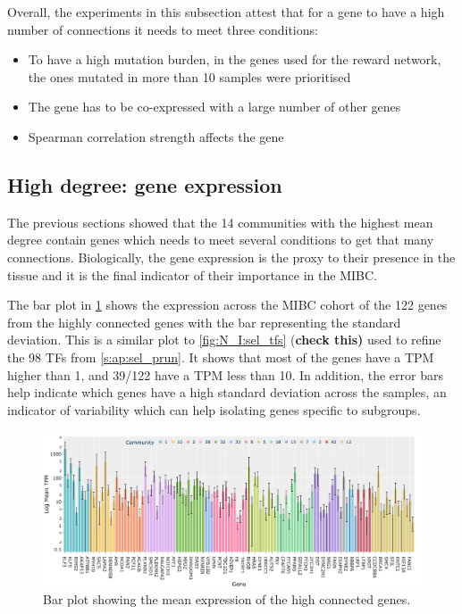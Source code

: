 Overall, the experiments in this subsection attest that for a gene to have a high number of connections it needs to meet three conditions:
\begin{itemize}
    \item To have a high mutation burden, in the genes used for the reward network, the ones mutated in more than 10 samples were prioritised
    \item The gene has to be co-expressed with a large number of other genes
    \item Spearman correlation strength affects the gene

\end{itemize}


\subsection{High degree: gene expression} \label{s:N_II:high_ge}

The previous sections showed that the 14 communities with the highest mean degree contain genes which needs to meet several conditions to get that many connections. Biologically, the gene expression is the proxy to their presence in the tissue and it is the final indicator of their importance in the MIBC.

The bar plot in \cref{fig:N_II:exp_molecular_highCon} shows the expression across the MIBC cohort of the 122 genes from the highly connected genes with the bar representing the standard deviation. This is a similar plot to \cref{fig:N_I:sel_tfs} (\textbf{check this)} used to refine the  98 TFs from \cref{s:ap:sel_prun}. It shows that most of the genes have a TPM higher than 1, and 39/122 have a TPM less than 10. In addition, the error bars help indicate which genes have a high standard deviation across the samples, an indicator of variability which can help isolating genes specific to subgroups. 


\begin{figure}[!htb]    
    \centering
    \includegraphics[width=1.0\textwidth,height=1.0\textheight,keepaspectratio]{Sections/Network_II/resources/reward/smallCom_Exp.png}
   \caption{Bar plot showing the mean expression of the high connected genes.}
    \label{fig:N_II:exp_molecular_highCon}
\end{figure}

